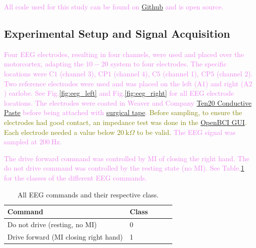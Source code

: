 \textcolor{violet}{All code used for this study can be found on \href{https://github.com/ELA411}{Github} and is open source.}


\subsection{Experimental Setup and Signal Acquisition}
\textcolor{violet}{Four EEG electrodes, resulting in four channels, were used and placed over the motorcortex, adapting the $10-20$ system to four electrodes. The specific locations were $\text{C}1$ (channel 3), $\text{CP}1$ (channel 4), $\text{C}5$ (channel 1), $\text{CP}5$ (channel 2). Two reference electrodes were used and was placed on the left ($\text{A}1$) and right ($\text{A}2$) earlobe.}
\textcolor{violet}{See Fig.\:\ref{fig:eeg_left} and Fig.\:\ref{fig:eeg_right} for all EEG electrode locations. The electrodes were coated in Weaver and Company \href{https://www.weaverandcompany.com/products/ten20/}{Ten20 Conductive Paste} before being attached with \href{https://www.apotekhjartat.se/product/hjartats-kirurgtejp-brun-25-cm-x-91-m/}{surgical tape}.}
\textcolor{olive}{Before sampling, to ensure the electrodes had good contact, an impedance test was done in the \href{https://docs.openbci.com/Software/OpenBCISoftware/GUIDocs/}{OpenBCI GUI}. Each electrode needed a value below $20\:\text{k}\Omega$ to be valid.} 
\textcolor{violet}{The EEG signal was sampled at $200\:\text{Hz}$.}

\textcolor{violet}{The drive forward command was controlled by MI of closing the right hand. The do not drive command was controlled by the resting state (no MI). See Table.\:\ref{tab:eeg_commands} for the classes of the different EEG commands.}

\begin{table}
	\centering
	\begin{tabular}{|l|l|l|l|l|}
		\hline
		Command                               & Class \\
		\hline
		Do not drive (resting, no MI)         & 0     \\
		Drive forward (MI closing right hand) & 1     \\
		\hline
	\end{tabular}
	\caption{All EEG commands and their respective class.}
	\label{tab:eeg_commands}
\end{table}

